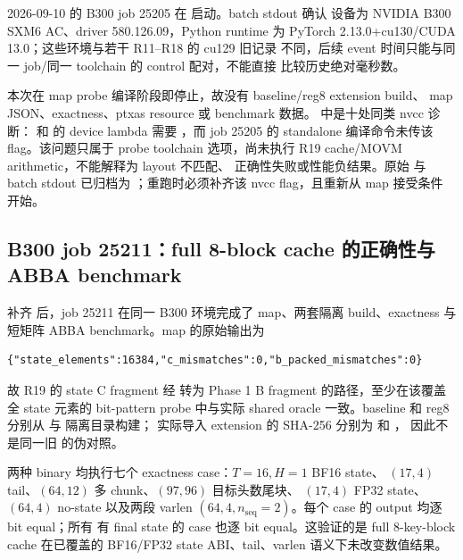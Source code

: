 2026-09-10 的 B300 job 25205 在
 启动。batch stdout 确认
设备为 NVIDIA B300 SXM6 AC、driver 580.126.09，Python runtime 为
PyTorch 2.13.0+cu130/CUDA 13.0；这些环境与若干 R11--R18 的 cu129 旧记录
不同，后续 event 时间只能与同一 job/同一 toolchain 的 control 配对，不能直接
比较历史绝对毫秒数。

本次在 map probe 编译阶段即停止，故没有 baseline/reg8 extension build、
map JSON、exactness、ptxas resource 或 benchmark 数据。
中是十处同类 nvcc 诊断： 和  的
device lambda 需要 ，而 job 25205 的 standalone
 编译命令未传该 flag。该问题只属于 probe
toolchain 选项，尚未执行 R19 cache/MOVM arithmetic，不能解释为 layout 不匹配、
正确性失败或性能负结果。原始  与 batch stdout 已归档为
；重跑时必须补齐该 nvcc flag，且重新从 map 接受条件
开始。

\subsection{B300 job 25211：full 8-block cache 的正确性与 ABBA benchmark}

补齐  后，job 25211 在同一 B300 环境完成了
map、两套隔离 build、exactness 与短矩阵 ABBA benchmark。map 的原始输出为

\begin{lstlisting}
{"state_elements":16384,"c_mismatches":0,"b_packed_mismatches":0}
\end{lstlisting}

故 R19 的  state C fragment 经  转为 Phase 1
B fragment 的路径，至少在该覆盖全 state 元素的 bit-pattern probe 中与实际
shared  oracle 一致。baseline 和 reg8 分别从
 与  隔离目录构建；
实际导入 extension 的 SHA-256 分别为
和
，
因此不是同一旧  的伪对照。

两种 binary 均执行七个 exactness case：\(T=16,H=1\) BF16 state、
\((17,4)\) tail、\((64,12)\) 多 chunk、\((97,96)\) 目标头数尾块、
\((17,4)\) FP32 state、\((64,4)\) no-state 以及两段 varlen
\((64,4,n_{\mathrm{seq}}=2)\)。每个 case 的 output 均逐 bit equal；所有
有 final state 的 case 也逐 bit equal。这验证的是 full 8-key-block cache
在已覆盖的 BF16/FP32 state ABI、tail、varlen 语义下未改变数值结果。

